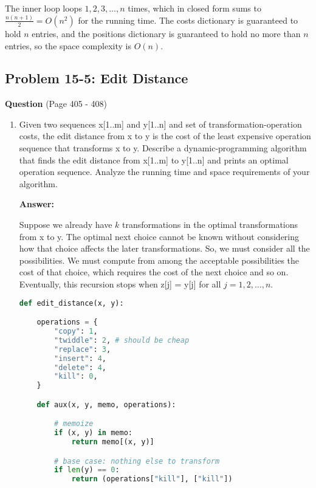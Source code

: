 \documentclass[]{book}
\theoremstyle{definition}
\begin{document}
    The inner loop loops $1, 2, 3, \dots, n$ times, which in closed form 
    sums to $\frac{n(n+1)}{2} = O(n^2)$ for the running time.
    The costs dictionary is guaranteed to hold $n$ entries, and the 
    positions dictionary is guaranteed to hold no more than $n$
    entries, so the space complexity is $O(n)$.

\subsection*{Problem 15-5: Edit Distance}

\textbf{Question}
    (Page 405 - 408)
    \begin{enumerate}[label={\alph*.}]
        \item 
            Given two sequences x[1..m] and y[1..n] and set of transformation-operation
            costs, the edit distance from x to y is the cost of the least expensive operation
            sequence that transforms x to y.
            Describe a dynamic-programming algorithm that finds the edit distance from 
            x[1..m] to y[1..n] and prints an optimal operation sequence.
            Analyze the running time and space requirements of your algorithm.

        \textbf{Answer:}

            Suppose we already have $k$ transformations in the optimal
            transformations from x to y.
            The optimal next choice cannot be known without considering
            how that choice affects the later transformations.
            So, we must consider all the possibilities. We must
            compute from among the acceptable possibilities the 
            cost of that choice, which requires the cost of the 
            next choice and so on. Eventually, this recursion
            stops when z[j] = y[j] for all $j = 1, 2, \dots, n$.
            \clearpage
            \begin{lstlisting}[language=Python, caption=Edit Distance Top-Down Memoization, label=snip:editdistance-top]
def edit_distance(x, y):

    operations = {
        "copy": 1,
        "twiddle": 2, # should be cheap
        "replace": 3,
        "insert": 4,
        "delete": 4,
        "kill": 0,
    }

    def aux(x, y, memo, operations):

        # memoize
        if (x, y) in memo:
            return memo[(x, y)]

        # base case: nothing else to transform
        if len(y) == 0:
            return (operations["kill"], ["kill"])


\end{lstlisting}
\end{enumerate}
\end{document}
